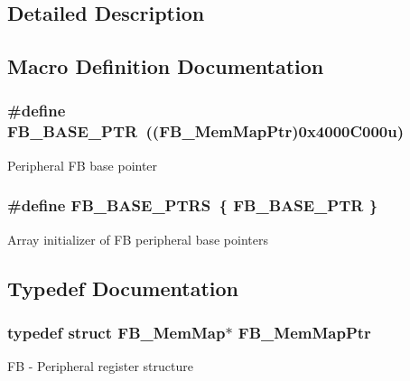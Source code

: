 \subsection{Detailed Description}


\subsection{Macro Definition Documentation}
\hypertarget{group___f_b___peripheral_gace69013248279ed94480b3d6f6aa9fa6}{}
\subsubsection[{F\+B\+\_\+\+B\+A\+S\+E\+\_\+\+P\+T\+R}]{\setlength{\rightskip}{0pt plus 5cm}\#define F\+B\+\_\+\+B\+A\+S\+E\+\_\+\+P\+T\+R~(({\bf F\+B\+\_\+\+Mem\+Map\+Ptr})0x4000\+C000u)}\label{group___f_b___peripheral_gace69013248279ed94480b3d6f6aa9fa6}
Peripheral F\+B base pointer \hypertarget{group___f_b___peripheral_ga0aa36a3189de1e68b58234782768941a}{}
\subsubsection[{F\+B\+\_\+\+B\+A\+S\+E\+\_\+\+P\+T\+R\+S}]{\setlength{\rightskip}{0pt plus 5cm}\#define F\+B\+\_\+\+B\+A\+S\+E\+\_\+\+P\+T\+R\+S~\{ {\bf F\+B\+\_\+\+B\+A\+S\+E\+\_\+\+P\+T\+R} \}}\label{group___f_b___peripheral_ga0aa36a3189de1e68b58234782768941a}
Array initializer of F\+B peripheral base pointers 

\subsection{Typedef Documentation}
\hypertarget{group___f_b___peripheral_gaebb09d71e958c6590cf946799cb4aa11}{}
\subsubsection[{F\+B\+\_\+\+Mem\+Map\+Ptr}]{\setlength{\rightskip}{0pt plus 5cm}typedef struct {\bf F\+B\+\_\+\+Mem\+Map}$\ast$ {\bf F\+B\+\_\+\+Mem\+Map\+Ptr}}\label{group___f_b___peripheral_gaebb09d71e958c6590cf946799cb4aa11}
F\+B -\/ Peripheral register structure 